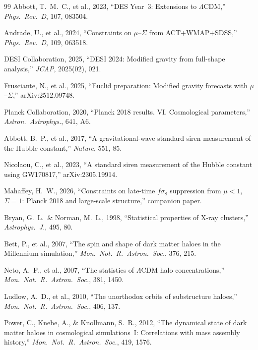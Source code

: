 \documentclass[11pt]{article}
\begin{document}
\begin{thebibliography}{99}
Abbott, T.~M.~C., et al., 2023, ``DES Year~3: Extensions to $\Lambda$CDM,''
\textit{Phys.\ Rev.\ D}, 107, 083504.

Andrade, U., et al., 2024, ``Constraints on $\mu$--$\Sigma$ from
ACT+WMAP+SDSS,'' \textit{Phys.\ Rev.\ D}, 109, 063518.

DESI Collaboration, 2025, ``DESI 2024: Modified gravity from full-shape
analysis,'' \textit{JCAP}, 2025(02), 021.

Frusciante, N., et al., 2025, ``Euclid preparation: Modified gravity
forecasts with $\mu$--$\Sigma$,'' arXiv:2512.09748.

Planck Collaboration, 2020, ``Planck 2018 results. VI. Cosmological
parameters,'' \textit{Astron.\ Astrophys.}, 641, A6.

Abbott, B.~P., et al., 2017, ``A gravitational-wave standard siren
measurement of the Hubble constant,'' \textit{Nature}, 551, 85.

Nicolaou, C., et al., 2023, ``A standard siren measurement of the Hubble
constant using GW170817,'' arXiv:2305.19914.

Mahaffey, H.~W., 2026, ``Constraints on late-time $f\sigma_8$ suppression
from $\mu < 1$, $\Sigma = 1$: Planck 2018 and large-scale structure,''
companion paper.

Bryan, G.~L.\ \& Norman, M.~L., 1998, ``Statistical properties of X-ray
clusters,'' \textit{Astrophys.\ J.}, 495, 80.

Bett, P., et al., 2007, ``The spin and shape of dark matter haloes in the
Millennium simulation,'' \textit{Mon.\ Not.\ R.\ Astron.\ Soc.}, 376, 215.

Neto, A.~F., et al., 2007, ``The statistics of $\Lambda$CDM halo
concentrations,'' \textit{Mon.\ Not.\ R.\ Astron.\ Soc.}, 381, 1450.

Ludlow, A.~D., et al., 2010, ``The unorthodox orbits of substructure
haloes,'' \textit{Mon.\ Not.\ R.\ Astron.\ Soc.}, 406, 137.

Power, C., Knebe, A., \& Knollmann, S.~R., 2012, ``The dynamical state of
dark matter haloes in cosmological simulations~I: Correlations with mass
assembly history,'' \textit{Mon.\ Not.\ R.\ Astron.\ Soc.}, 419, 1576.


\end{thebibliography}
\end{document}
